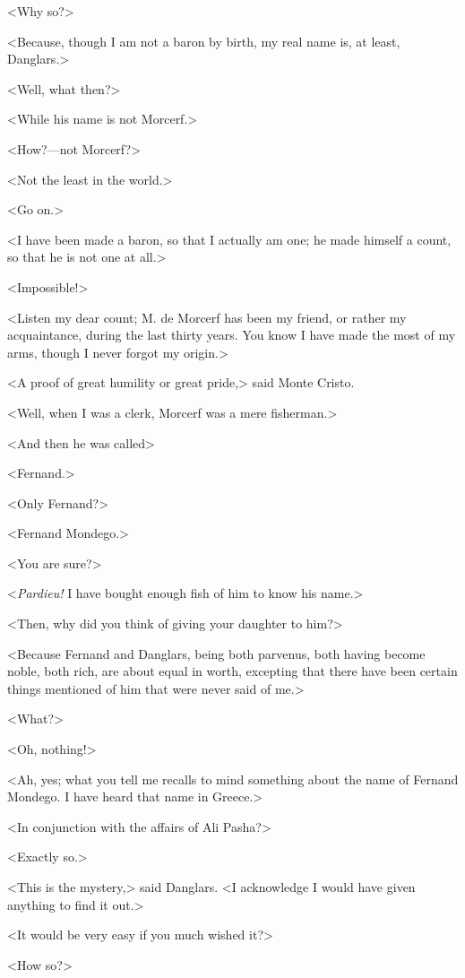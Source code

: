  <Why so?> 

 <Because, though I am not a baron by birth, my real name is, at least, Danglars.> 

 <Well, what then?> 

 <While his name is not Morcerf.> 

 <How?—not Morcerf?> 

 <Not the least in the world.> 

 <Go on.> 

 <I have been made a baron, so that I actually am one; he made himself a count, so that he is not one at all.> 

 <Impossible!> 

 <Listen my dear count; M. de Morcerf has been my friend, or rather my acquaintance, during the last thirty years. You know I have made the most of my arms, though I never forgot my origin.> 

 <A proof of great humility or great pride,> said Monte Cristo. 

 <Well, when I was a clerk, Morcerf was a mere fisherman.> 

 <And then he was called\longdash> 

 <Fernand.> 

 <Only Fernand?> 

 <Fernand Mondego.> 

 <You are sure?> 

 <\textit{Pardieu!} I have bought enough fish of him to know his name.> 

 <Then, why did you think of giving your daughter to him?> 

 <Because Fernand and Danglars, being both parvenus, both having become noble, both rich, are about equal in worth, excepting that there have been certain things mentioned of him that were never said of me.> 

 <What?> 

 <Oh, nothing!> 

 <Ah, yes; what you tell me recalls to mind something about the name of Fernand Mondego. I have heard that name in Greece.> 

 <In conjunction with the affairs of Ali Pasha?> 

 <Exactly so.> 

 <This is the mystery,> said Danglars. <I acknowledge I would have given anything to find it out.> 

 <It would be very easy if you much wished it?> 

 <How so?> 

